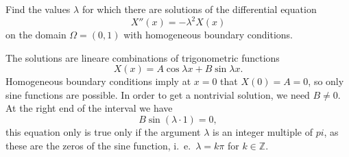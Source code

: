 Find the values $\lambda$ for which there are solutions of the differential
equation
\[
X''(x)= -\lambda^2 X(x)
\]
on the domain $\Omega = (0,1)$ with homogeneous boundary conditions.

\begin{loesung}
The solutions are lineare combinations of trigonometric functions
\[
X(x) = A \cos\lambda x + B \sin\lambda x.
\]
Homogeneous boundary conditions imply at $x=0$ that
$X(0)=A=0$, so only sine functions are possible. 
In order to get a nontrivial solution, we need $B\ne 0$.
At the right end of the interval we have
\[
B \sin (\lambda\cdot 1) = 0,
\]
this equation only is true only if the argument $\lambda$ is an integer
multiple of $pi$, as these are the zeros of the sine function,
i.~e.~$\lambda = k\pi$ for $k\in\mathbb{Z}$.
\end{loesung}
